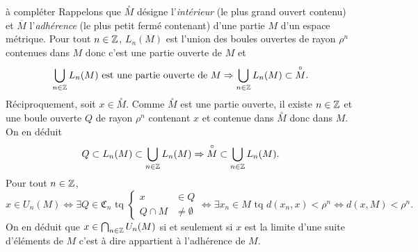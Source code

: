 \begin{demo}
 à compléter\newline
 Rappelons que $\overset{\circ}{M}$ désigne l'\emph{intérieur} (le plus grand ouvert contenu) et $\overline{M}$ l'\emph{adhérence} (le plus petit fermé contenant) d'une partie $M$ d'un espace métrique.\newline
 Pour tout $n\in \mathbb{Z}$, $L_n(M)$ est l'union des boules ouvertes de rayon $\rho^n$ contenues dans $M$ donc c'est une partie ouverte de $M$ et
\begin{displaymath}
 \bigcup_{n \in \mathbb{Z}} L_n(M) \text{ est une partie ouverte de } M \Rightarrow \bigcup_{n \in \mathbb{Z}} L_n(M) \subset \overset{\circ}{M}.
\end{displaymath}
Réciproquement, soit $x \in \overset{\circ}{M}$. Comme $\overset{\circ}{M}$ est une partie ouverte, il existe $n\in \mathbb{Z}$ et une boule ouverte $Q$ de rayon $\rho^n$ contenant $x$ et contenue dans $\overset{\circ}{M}$ donc dans $M$. On en déduit
\begin{displaymath}
 Q \subset L_n(M) \subset \bigcup_{n \in \mathbb{Z}} L_n(M) \Rightarrow \overset{\circ}{M} \subset \bigcup_{n \in \mathbb{Z}} L_n(M).
\end{displaymath}
Pour tout $n\in \mathbb{Z}$,
\begin{displaymath}
 x \in U_n(M)
 \Leftrightarrow
   \exists Q \in \mathfrak{C}_n \text{ tq }
     \left\lbrace
       \begin{aligned}
         x &\in Q \\
         Q\cap M &\neq \emptyset
       \end{aligned}
     \right.
  \Leftrightarrow
    \exists x_n \in M \text{ tq } d(x_n, x) < \rho^n
  \Leftrightarrow
    d(x,M) < \rho^n.
\end{displaymath}
On en déduit que $x \in \bigcap_{n\in \mathbb{Z}}U_n(M)$ si et seulement si $x$ est la limite d'une suite d'éléments de $M$ c'est à dire appartient à l'adhérence de $M$.
\end{demo}

